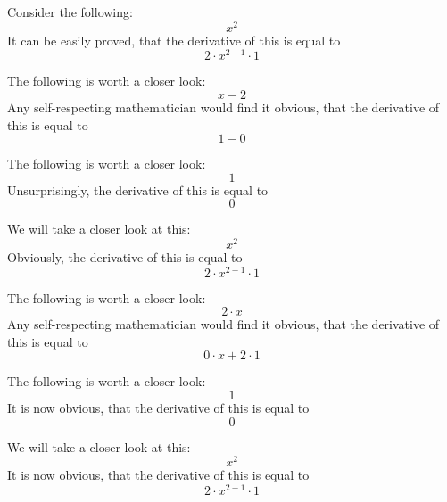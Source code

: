 \documentclass{article}
\begin{document}
Consider the following:
\begin{equation}
x ^{2 } 
\end{equation}
It can be easily proved, that the derivative of this is equal to
\begin{equation}
2 \cdot x ^{2 - 1 } \cdot 1 
\end{equation}

The following is worth a closer look:
\begin{equation}
x - 2 
\end{equation}
Any self-respecting mathematician would find it obvious, that the derivative of this is equal to
\begin{equation}
1 - 0 
\end{equation}

The following is worth a closer look:
\begin{equation}
1 
\end{equation}
Unsurprisingly, the derivative of this is equal to
\begin{equation}
0 
\end{equation}

We will take a closer look at this:
\begin{equation}
x ^{2 } 
\end{equation}
Obviously, the derivative of this is equal to
\begin{equation}
2 \cdot x ^{2 - 1 } \cdot 1 
\end{equation}

The following is worth a closer look:
\begin{equation}
2 \cdot x 
\end{equation}
Any self-respecting mathematician would find it obvious, that the derivative of this is equal to
\begin{equation}
0 \cdot x + 2 \cdot 1 
\end{equation}

The following is worth a closer look:
\begin{equation}
1 
\end{equation}
It is now obvious, that the derivative of this is equal to
\begin{equation}
0 
\end{equation}

We will take a closer look at this:
\begin{equation}
x ^{2 } 
\end{equation}
It is now obvious, that the derivative of this is equal to
\begin{equation}
2 \cdot x ^{2 - 1 } \cdot 1 
\end{equation}
\end{document}
